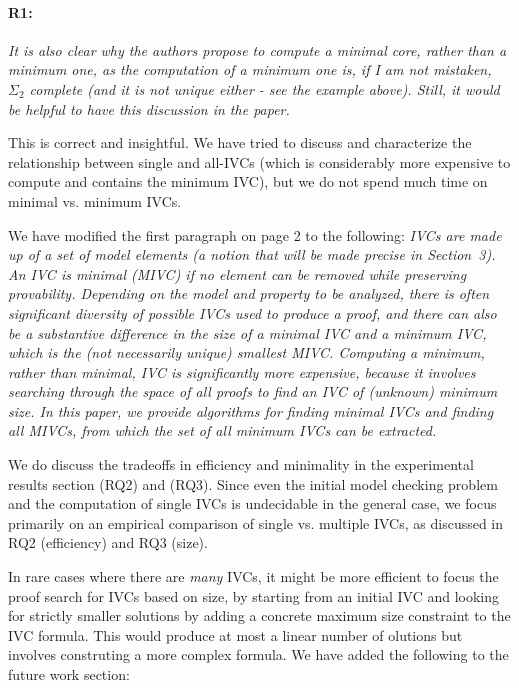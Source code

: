 \documentclass{article}
\begin{document}
\paragraph{R1:} \textit{It is also clear why the authors propose to compute a minimal core, rather than a minimum one, as the computation of a minimum one is, if I am not mistaken, $\Sigma_2$ complete (and it is not unique either - see the example above). Still, it would be helpful to have this discussion in the paper.}
\vspace{0.05in}

\noindent This is correct and insightful.  We have tried to discuss and characterize the relationship between single and all-IVCs (which is considerably more expensive to compute and contains the minimum IVC), but we do not spend much time on minimal vs. minimum IVCs.

We have modified the first paragraph on page 2 to the following:
\textit{IVCs are made up of a set of model elements (a notion that will be made precise in Section~3).  An IVC is {\em minimal} (MIVC) if no element can be removed while preserving provability.  Depending on the model and property to be analyzed, there is often significant diversity of possible IVCs used to produce a proof, and there can also be a substantive difference in the size of a {\em minimal} IVC and a {\em minimum} IVC, which is the (not necessarily unique) smallest MIVC.  Computing a minimum, rather than minimal, IVC is significantly more expensive, because it involves searching through the space of all proofs to find an IVC of (unknown) minimum size.  In this paper, we provide algorithms for finding minimal IVCs and finding {\em all} MIVCs, from which the set of all minimum IVCs can be extracted.}

We do discuss the tradeoffs in efficiency and minimality in the experimental results section (RQ2) and (RQ3).  Since even the initial model checking problem and the computation of single IVCs is undecidable in the general case, we focus primarily on an empirical comparison of single vs. multiple IVCs, as discussed in RQ2 (efficiency) and RQ3 (size).

In rare cases where there are {\em many} IVCs, it might be more efficient to focus the proof search for IVCs based on size, by starting from an initial IVC and looking for strictly smaller solutions by adding a concrete maximum size constraint to the IVC formula.  This would produce at most a linear number of olutions but involves construting a more complex formula.  We have added the following to the future work section:
\end{document}
